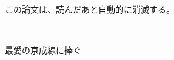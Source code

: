 \documentclass[a4paper,11pt]{jsbook}
\begin{document}
\title{}

\author{工藤健太 \\
China Institute of Technology}

\date{2021年12月17日}

\maketitle

この論文は、読んだあと自動的に消滅する。
\clearpage

\thispagestyle{empty}
\vfil
\ \\
\vspace{15em}
\begin{center}
	{\Large 最愛の京成線に捧ぐ }
\end{center}



\tableofcontents




\cleardoublepage
{}






\appendix





\newpage
\printindex
\end{document}
